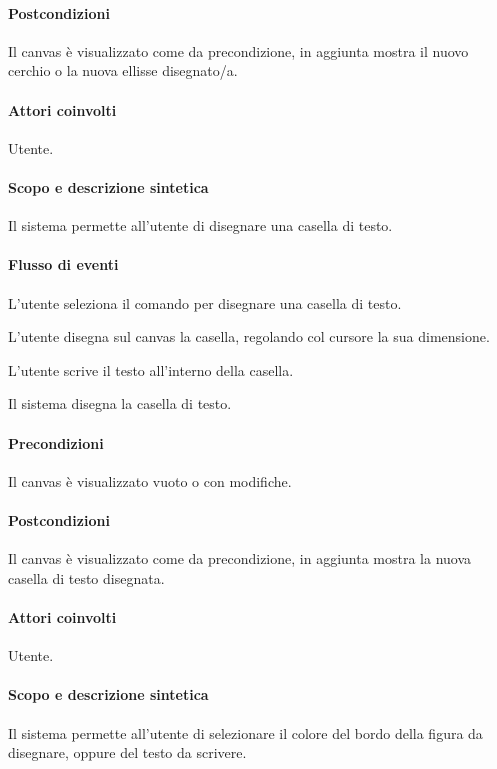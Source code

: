 \paragraph{Postcondizioni} Il canvas \`e visualizzato come da precondizione, in aggiunta mostra il nuovo cerchio o la nuova ellisse disegnato/a.

\paragraph{Attori coinvolti} Utente.
\paragraph{Scopo e descrizione sintetica} 
Il sistema permette all'utente di disegnare una casella di testo.
\paragraph{Flusso di eventi}
\begin{elenconumerato}[\textbf{}]{\subsubsecindent}
\item L'utente seleziona il comando per disegnare una casella di testo.
\item L'utente disegna sul canvas la casella, regolando col cursore la sua dimensione.
\item L'utente scrive il testo all'interno della casella.
\item Il sistema disegna la casella di testo.
\end{elenconumerato}
\paragraph{Precondizioni} Il canvas \`e visualizzato vuoto o con modifiche.
\paragraph{Postcondizioni} Il canvas \`e visualizzato come da precondizione, in aggiunta mostra la nuova casella di testo disegnata.

\paragraph{Attori coinvolti} Utente.
\paragraph{Scopo e descrizione sintetica} 
Il sistema permette all'utente di selezionare il colore del bordo della figura da disegnare, oppure del testo da scrivere.
